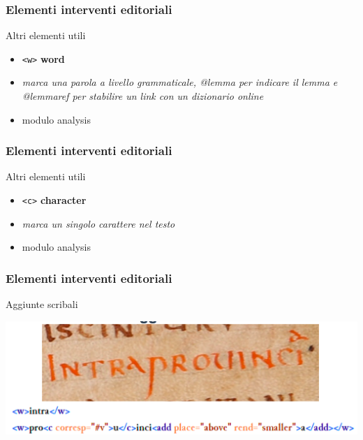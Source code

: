 \begin{frame}
    \frametitle{Elementi interventi editoriali}
    \addtocounter{nframe}{1}
    
    \begin{block}{Altri elementi utili}
        \begin{itemize}
            \item \texttt{<w>} \textbf{word}
            \item[] \textit{marca una parola a livello grammaticale, @lemma per indicare il lemma e @lemmaref per stabilire un link con un dizionario online}
            \item[] modulo analysis
        \end{itemize}
        
    \end{block}
    
\end{frame}

\begin{frame}
    \frametitle{Elementi interventi editoriali}
    \addtocounter{nframe}{1}
    
    \begin{block}{Altri elementi utili}
        \begin{itemize}
            \item \texttt{<c>} \textbf{character}
            \item[] \textit{marca un singolo carattere nel testo}
            \item[] modulo analysis
        \end{itemize}
        
    \end{block}
    
\end{frame} 


\begin{frame}
    \frametitle{Elementi interventi editoriali}
    \addtocounter{nframe}{1}
    
   
    \begin{block}{Aggiunte scribali}
        \begin{center}
            \includegraphics[width=.9\textwidth]{imgs/Aggiunte-1.png}
        \end{center}

    \end{block}
    
\end{frame} 

